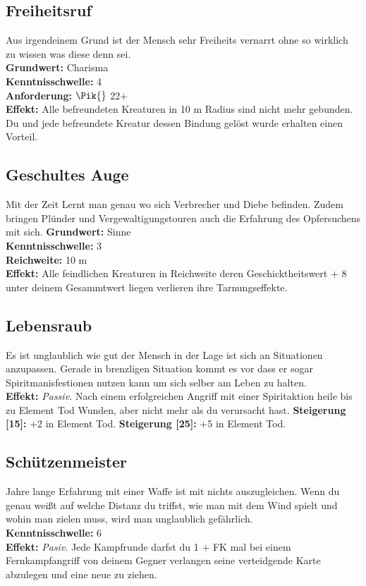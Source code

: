 \subsection*{Freiheitsruf} \label{sk:freiheitsruf}
Aus irgendeinem Grund ist der Mensch sehr Freiheits vernarrt ohne so wirklich zu wissen was diese denn sei.\\
\textbf{Grundwert:} Charisma \\
\textbf{Kenntnisschwelle:} 4 \\
\textbf{Anforderung:} $\Pik{}$ 22+\\
\textbf{Effekt:} Alle befreundeten Kreaturen in 10 m Radius sind nicht mehr gebunden. Du und jede befreundete Kreatur dessen Bindung gelöst wurde erhalten einen Vorteil.


\subsection*{Geschultes Auge} \label{sk:geschultesauge}
Mit der Zeit Lernt man genau wo sich Verbrecher und Diebe befinden. Zudem bringen Plünder und Vergewaltigungstouren auch die Erfahrung des Opfersuchens mit sich.
\textbf{Grundwert:} Sinne \\
\textbf{Kenntnisschwelle:} 3 \\
\textbf{Reichweite:} 10 m \\
\textbf{Effekt:} Alle feindlichen Kreaturen in Reichweite deren Geschicktheitswert + 8 unter deinem Gesammtwert liegen verlieren ihre Tarnungseffekte.


\subsection*{Lebensraub} \label{sk:lebensraub}
Es ist unglaublich wie gut der Mensch in der Lage ist sich an Situationen anzupassen. Gerade in brenzligen Situation kommt es vor dass er sogar Spiritmanisfestionen nutzen kann um sich selber am Leben zu halten. \\
\textbf{Effekt:} \textit{Passiv.} Nach einem erfolgreichen Angriff mit einer Spiritaktion heile bis zu Element Tod Wunden, aber nicht mehr als du verursacht hast.
\textbf{Steigerung [15]:} +2 in Element Tod.
\textbf{Steigerung [25]:} +5 in Element Tod.

\subsection*{Schützenmeister} \label{sk:schützenmeister}
Jahre lange Erfahrung mit einer Waffe ist mit nichts auszugleichen. Wenn du genau weißt auf welche Distanz du triffst, wie man mit dem Wind spielt und wohin man zielen muss, wird man unglaublich gefährlich.\\
\textbf{Kenntnisschwelle:} 6 \\
\textbf{Effekt:} \textit{Pasiv}. Jede Kampfrunde darfst du 1 + FK mal bei einem Fernkampfangriff von deinem Gegner verlangen seine verteidgende Karte abzulegen und eine neue zu ziehen.

